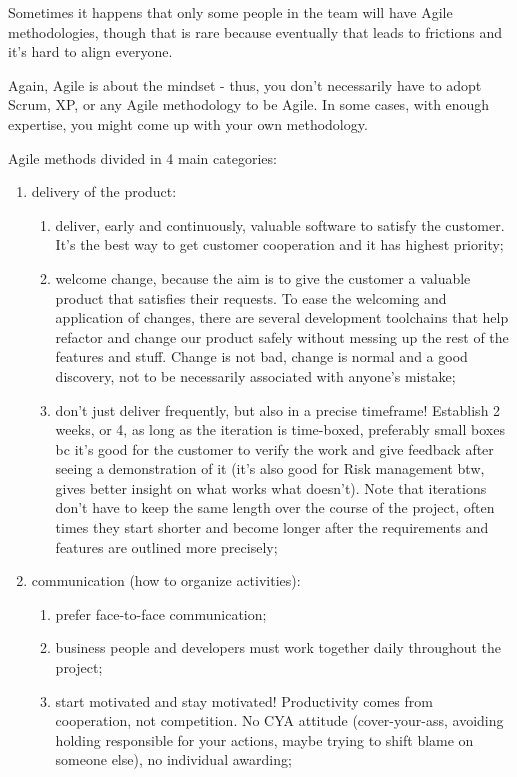 Sometimes it happens that only some people in the team will have Agile methodologies, though that is rare because eventually that leads to frictions and it's hard to align everyone.

 \noindent Again, Agile is about the mindset - thus, you don't necessarily have to adopt Scrum, XP, or any Agile methodology to be Agile. In some cases, with enough expertise, you might come up with your own methodology.


\noindent Agile methods divided in 4 main categories:
\begin{enumerate}
    \item delivery of the product:
    \begin{enumerate}
        \item deliver, early and continuously, valuable software to satisfy the customer. It's the best way to get customer cooperation and it has highest priority;
        \item welcome change, because the aim is to give the customer a valuable product that satisfies their requests. To ease the welcoming and application of changes, there are several development toolchains that help refactor and change our product safely without messing up the rest of the features and stuff. Change is not bad, change is normal and a good discovery, not to be necessarily associated with anyone's mistake;
        \item don't just deliver frequently, but also in a precise timeframe! Establish 2 weeks, or 4, as long as the iteration is time-boxed, preferably small boxes bc it's good for the customer to verify the work and give feedback after seeing a demonstration of it (it's also good for Risk management btw, gives better insight on what works what doesn't). Note that iterations don't have to keep the same length over the course of the project, often times they start shorter and become longer after the requirements and features are outlined more precisely;
    \end{enumerate}
    \item communication (how to organize activities): 
    \begin{enumerate}
    \item prefer face-to-face communication;
    \item business people and developers must work together daily throughout the project;
    \item start motivated and stay motivated! Productivity comes from cooperation, not competition. No CYA attitude (cover-your-ass, avoiding holding responsible for your actions, maybe trying to shift blame on someone else), no individual awarding;


\end{enumerate}
\end{enumerate}
